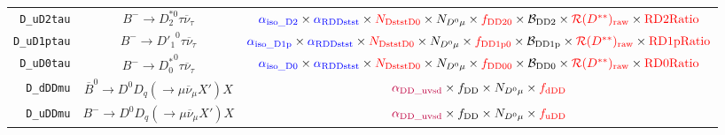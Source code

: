 \begin{landscape}
\begin{table}
\begin{tabular}{r|c|c}
       \texttt{D\_uD2tau} &                 $B^- \rightarrow D_2^{*0} \tau \overline{\nu}_\tau$                  &                            $\textcolor{blue}{\alpha_\text{iso\_D2}} \times \textcolor{blue}{\alpha_\text{RDDstst}} \times \textcolor{red}{N_\text{DststD0}} \times N_{D^0 \mu} \times \textcolor{red}{f_\text{DD20}} \times \mathcal{B}_\text{DD2} \times \textcolor{red}{\mathcal{R}(D^{**})_\text{raw}} \times \textcolor{red}{\text{RD2Ratio}}$                            \\
      \texttt{D\_uD1ptau} &                 $B^- \rightarrow {D'_1}^0 \tau \overline{\nu}_\tau$                  &                          $\textcolor{blue}{\alpha_\text{iso\_D1p}} \times \textcolor{blue}{\alpha_\text{RDDstst}} \times \textcolor{red}{N_\text{DststD0}} \times N_{D^0 \mu} \times \textcolor{red}{f_\text{DD1p0}} \times \mathcal{B}_\text{DD1p} \times \textcolor{red}{\mathcal{R}(D^{**})_\text{raw}} \times \textcolor{red}{\text{RD1pRatio}}$                          \\
       \texttt{D\_uD0tau} &                 $B^- \rightarrow {D^*_0}^0 \tau \overline{\nu}_\tau$                 &                            $\textcolor{blue}{\alpha_\text{iso\_D0}} \times \textcolor{blue}{\alpha_\text{RDDstst}} \times \textcolor{red}{N_\text{DststD0}} \times N_{D^0 \mu} \times \textcolor{red}{f_\text{DD00}} \times \mathcal{B}_\text{DD0} \times \textcolor{red}{\mathcal{R}(D^{**})_\text{raw}} \times \textcolor{red}{\text{RD0Ratio}}$                            \\
        \texttt{D\_dDDmu} &    $\overline{B}^0 \rightarrow D^0 D_q (\rightarrow \mu \overline{\nu}_\mu X') X$    &                                                                                                                            $\textcolor{purple}{\alpha_\text{DD\_uvsd}} \times f_\text{DD} \times N_{D^0 \mu} \times \textcolor{red}{f_\text{dDD}}$                                                                                                                            \\
        \texttt{D\_uDDmu} &         $B^- \rightarrow D^0 D_q (\rightarrow \mu \overline{\nu}_\mu X') X$          &                                                                                                                            $\textcolor{purple}{\alpha_\text{DD\_uvsd}} \times f_\text{DD} \times N_{D^0 \mu} \times \textcolor{red}{f_\text{uDD}}$                                                                                                                            \\

\end{tabular}
\end{table}
\end{landscape}
